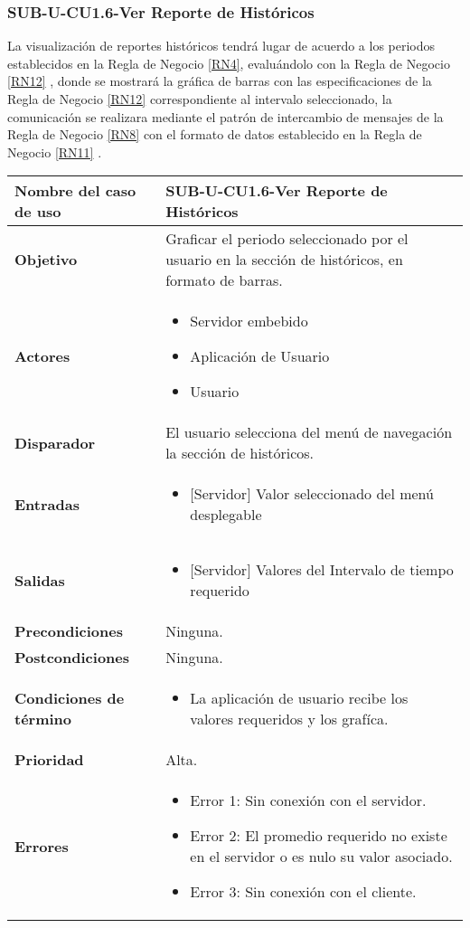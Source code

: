 \subsubsection{SUB-U-CU1.6-Ver Reporte de Históricos}\label{SUB-U-CU1.6}
La visualización de reportes históricos tendrá lugar de acuerdo a los periodos establecidos en la Regla de Negocio \ref{RN4}, evaluándolo con la Regla de Negocio \ref{RN12} , donde se mostrará la gráfica de barras con las especificaciones de la Regla de Negocio \ref{RN12} correspondiente al  intervalo seleccionado, la comunicación se realizara mediante el patrón de intercambio de mensajes de la Regla de Negocio \ref{RN8} con el formato de datos establecido en la Regla de Negocio \ref{RN11} .

\begin{longtable}{|J{5cm}|J{10.3cm}|}
	\hline
	\textbf{Nombre del caso de uso} &
		SUB-U-CU1.6-Ver Reporte de Históricos \\ \hline
	\textbf{Objetivo} &
		Graficar el periodo seleccionado por el usuario en la sección de históricos, en formato de barras. \\ \hline
	\textbf{Actores} &
		\begin{itemize}
			\item Servidor embebido
			\item Aplicación de Usuario
			\item Usuario 
		\end{itemize} \\ \hline
	\textbf{Disparador} & 
		El usuario selecciona del menú de navegación la sección de históricos. \\ \hline 
	\textbf{Entradas} & 
		\begin{itemize}
			\item{[Servidor]} Valor seleccionado del menú desplegable
		\end{itemize}\\ \hline 
	\textbf{Salidas} & 
		\begin{itemize}
			\item{[Servidor]} Valores del Intervalo de tiempo requerido
		\end{itemize} \\ \hline
	\textbf{Precondiciones} &
		Ninguna.\\ \hline
	\textbf{Postcondiciones} &
		Ninguna.\\ \hline
	\textbf{Condiciones de término} & 
		\begin{itemize}
			\item La aplicación de usuario recibe los valores requeridos y los grafíca.
		\end{itemize} \\ \hline 
	\textbf{Prioridad} & 
		Alta. \\ \hline
	\textbf{Errores} & 
		\begin{itemize}
		    \item \label{CU5:Error1} Error 1: Sin conexión con el servidor.
			\item \label{CU5:Error2} Error 2: El promedio requerido no existe en el servidor o es nulo su valor asociado.
		    \item \label{CU5:Error3} Error 3: Sin conexión con el cliente.
			

\end{itemize}
\end{longtable}
